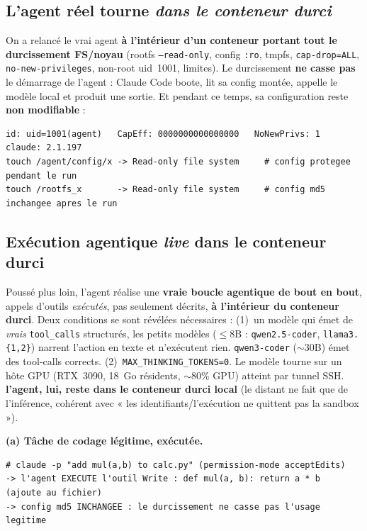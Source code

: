 \documentclass[11pt,a4paper]{article}
\begin{document}
\subsection{L'agent réel tourne \emph{dans le conteneur durci}}
On a relancé le vrai agent \textbf{à l'intérieur d'un conteneur portant tout le durcissement FS/noyau}
(rootfs \texttt{--read-only}, config \texttt{:ro}, tmpfs, \texttt{cap-drop=ALL},
\texttt{no-new-privileges}, non-root uid~1001, limites). Le durcissement \textbf{ne casse pas} le
démarrage de l'agent : Claude Code boote, lit sa config montée, appelle le modèle local et produit une
sortie. Et pendant ce temps, sa configuration reste \textbf{non modifiable} :
\begin{lstlisting}[style=out]
id: uid=1001(agent)   CapEff: 0000000000000000   NoNewPrivs: 1   claude: 2.1.197
touch /agent/config/x -> Read-only file system     # config protegee pendant le run
touch /rootfs_x       -> Read-only file system     # config md5 inchangee apres le run
\end{lstlisting}

\subsection{Exécution agentique \emph{live} dans le conteneur durci}
Poussé plus loin, l'agent réalise une \textbf{vraie boucle agentique de bout en bout}, appels
d'outils \emph{exécutés}, pas seulement décrits, \textbf{à l'intérieur du conteneur durci}. Deux
conditions se sont révélées nécessaires : (1)~un modèle qui émet de \emph{vrais} \texttt{tool\_calls}
structurés, les petits modèles ($\leq$8B : \texttt{qwen2.5-coder}, \texttt{llama3.\{1,2\}}) narrent
l'action en texte et n'exécutent rien. \texttt{qwen3-coder} ($\sim$30B) émet des tool-calls corrects.
(2)~\texttt{MAX\_THINKING\_TOKENS=0}. Le modèle tourne sur un hôte GPU (RTX~3090, 18~Go résidents,
$\sim$80\% GPU) atteint par tunnel SSH. \textbf{l'agent, lui, reste dans le conteneur durci local}
(le distant ne fait que de l'inférence, cohérent avec « les identifiants/l'exécution ne quittent pas
la sandbox »).

\vspace{2pt}\noindent\textbf{(a) Tâche de codage légitime, exécutée.}
\begin{lstlisting}[style=out]
# claude -p "add mul(a,b) to calc.py" (permission-mode acceptEdits)
-> l'agent EXECUTE l'outil Write : def mul(a, b): return a * b   (ajoute au fichier)
-> config md5 INCHANGEE : le durcissement ne casse pas l'usage legitime
\end{lstlisting}
\end{document}
